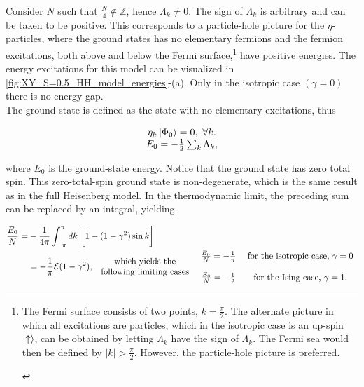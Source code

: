 \documentclass{homework}
\begin{document}
Consider $N$ such that $\frac{N}{4} \notin \mathds{Z}$, hence $\Lambda_k \neq 0$. The sign of $\Lambda_k$ is arbitrary and can be taken to be positive. This corresponds to a particle-hole picture for the $\eta$-particles, where the ground states has no elementary fermions and the fermion excitations, both above and below the Fermi surface,\footnote{\begin{tcolorbox}[colback = yellow, title = Physical Context]

The Fermi surface consists of two points, $k = \frac{\pi}{2}$. The alternate picture in which all excitations are particles, which in the isotropic case is an up-spin $\ket{\uparrow}$, can be obtained by letting $\Lambda_k$ have the sign of $\Lambda_k$. The Fermi sea would then be defined by $|k| > \frac{\pi}{2}.$ However, the particle-hole picture is preferred. 

\end{tcolorbox}} have positive energies. The energy excitations for this model can be visualized in \cref{fig:XY_S=0.5_HH_model_energies}-(a). Only in the isotropic case $(\gamma = 0)$ there is no energy gap.\\

The ground state is defined as the state with no elementary excitations, thus 

\begin{equation}
\begin{array}{cc}
     \eta_{k} \ket{\Phi_0} = 0, \textnormal{ } \forall k.  \\
     E_0 = -\frac{1}{2} \sum_{k} \Lambda_k,
     \label{XY_ccyclic_gs}
\end{array}
\end{equation}

where $E_0$ is the ground-state energy. Notice that the ground state has zero total spin. This zero-total-spin ground state is non-degenerate, which is the same result as in the full Heisenberg model. 
In the thermodynamic limit, the preceding sum can be replaced by an integral, yielding 

\begin{equation}
    \begin{split}
    \frac{E_0}{N} =& -\frac{1}{4\pi} \int_{-\pi}^{\pi} dk \textnormal{ } \bigg[1 - (1-\gamma^2) \sin k \bigg] \\
    &= - \frac{1}{\pi} \mathcal{E}(1-\gamma^2),
    \begin{array}{cc}
         \textnormal{ which yields the  }  \\
         \textnormal{ following limiting cases }
    \end{array} \begin{array}{cc}
     \frac{E_0}{N} = - \frac{1}{\pi} & \textnormal{ for the isotropic case, } \gamma = 0\\ 
     \\
     \frac{E_0}{N} = - \frac{1}{2} & \textnormal{ for the Ising case, } \gamma = 1. 
\end{array}
    \end{split} 
\end{equation} 
\end{document}
